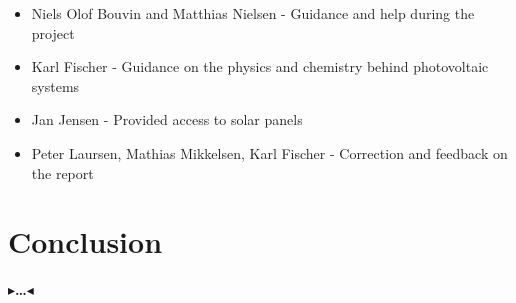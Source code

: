 \documentclass[a4paper]{article}
\newcommand{\todo}[1]{{\color[rgb]{.5,0,0}\textbf{$\blacktriangleright$#1$\blacktriangleleft$}}}
\begin{document}
\begin{itemize}
\item Niels Olof Bouvin and Matthias Nielsen - Guidance and help
  during the project
\item Karl Fischer - Guidance on the physics and chemistry behind
  photovoltaic systems
\item Jan Jensen - Provided access to solar panels
\item Peter Laursen, Mathias Mikkelsen, Karl Fischer - Correction and feedback on the report
\end{itemize}

\section{Conclusion}
\label{ch:conclusion}

\todo{\dots}




\end{document}
